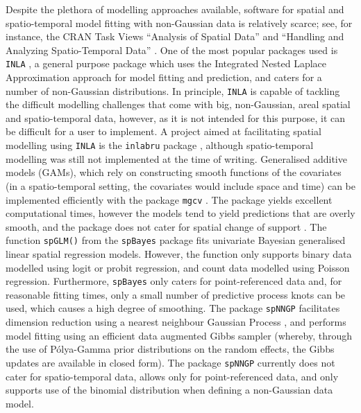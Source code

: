\documentclass[12pt,a4paper]{article}
\begin{document}
Despite the plethora of modelling approaches available, software for spatial and spatio-temporal model fitting with non-Gaussian data is relatively scarce; see, for instance, the CRAN Task Views ``Analysis of Spatial Data'' \citep{CRAN_Task_View:spatial} and ``Handling and Analyzing Spatio-Temporal Data'' \citep{CRAN_Task_View:spatio-temporal}.
One of the most popular packages used is \texttt{INLA} \citep{Lindgren_2015_R-INLA}, a general purpose package which uses the Integrated Nested Laplace Approximation \citep{Rue_2009_INLA} approach for model fitting and prediction, and caters for a number of non-Gaussian distributions. 
In principle, \texttt{INLA} is capable of tackling the difficult modelling challenges that come with big, non-Gaussian, areal spatial and spatio-temporal data, however, as it is not intended for this purpose, it can be difficult for a user to implement. 
A project aimed at facilitating spatial modelling using \texttt{INLA} is the \texttt{inlabru} package \citep{Bachl_2019_inlabru}, although spatio-temporal modelling was still not implemented at the time of writing.
Generalised additive models (GAMs), which rely on constructing smooth functions of the covariates (in a spatio-temporal setting, the covariates would include space and time) can be implemented efficiently with the package \texttt{mgcv} \citep{Wood_2001_mgcv}. 
The package yields excellent computational times, however the models tend to yield predictions that are overly smooth, and the package does not cater for spatial change of support .
The function \texttt{spGLM()} from the \texttt{spBayes} package \citep{Finley_2015_spBayes} fits univariate Bayesian generalised linear spatial regression models. 
However, the function only supports binary data modelled using logit or probit regression, and count data modelled using Poisson regression. 
Furthermore, \texttt{spBayes} only caters for point-referenced data and, for reasonable fitting times, only a small number of predictive process knots can be used, which causes a high degree of smoothing.
The package \texttt{spNNGP} \citep{Finley_2020_spNNGP} facilitates dimension reduction using a nearest neighbour Gaussian Process \citep{Datta_2016_NNGP_spatial}, and performs model fitting using an efficient data augmented Gibbs sampler (whereby, through the use of Pólya-Gamma prior distributions \citep{Polson_2013_Polya-Gamma_Bayesian_logistic} on the random effects, the Gibbs updates are available in closed form). 
The package \texttt{spNNGP} currently does not cater for spatio-temporal data, allows only for point-referenced data, and only supports use of the binomial distribution when defining a non-Gaussian data model. 
 
\end{document}
